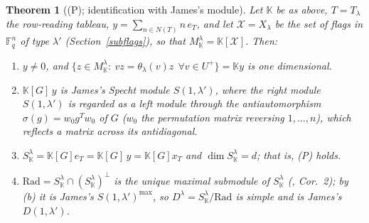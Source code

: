 \documentclass[11pt, letterpaper]{amsart}
\newtheorem{theorem}{Theorem}
\theoremstyle{definition}
\theoremstyle{remark}
\newcommand{\FF}{\mathbb{F}}
\newcommand{\KK}{\mathbb{K}}
\begin{document}
\begin{theorem}[(P); identification with James's module]\label{thmP}
Let $\KK$ be as above, $T=T_\lambda$ the row-reading tableau, $y=\sum_{n\in N(T)}n\,e_T$, and let $\mathcal X=X_\lambda$ be the set of flags in $\FF_q^n$ of type $\lambda'$ (Section~\ref{subflags}), so that $M^\lambda_\KK=\KK[\mathcal X]$. Then:
\begin{enumerate}
\item[(a)] $y\neq0$, and $\{z\in M^\lambda_\KK:\ vz=\theta_\lambda(v)z\ \ \forall v\in U^+\}=\KK y$ is one dimensional.
\item[(b)] $\KK[G]\,y$ is James's Specht module $S(1,\lambda')$, where the right module $S(1,\lambda')$ is regarded as a left module through the antiautomorphism $\sigma(g)=w_0g^{T}w_0$ of $G$ ($w_0$ the permutation matrix reversing $1,\dots,n$), which reflects a matrix across its antidiagonal.
\item[(c)] $S^\lambda_\KK=\KK[G]e_T=\KK[G]\,y=\KK[G]x_T$ and $\dim S^\lambda_\KK=d$; that is, (P) holds.
\item[(d)] $\mathrm{Rad}=S^\lambda_\KK\cap(S^\lambda_\KK)^\perp$ is the unique maximal submodule of $S^\lambda_\KK$ (\cite{AN2}, Cor.~2); by (b) it is James's $S(1,\lambda')^{\max}$, so $D^\lambda=S^\lambda_\KK/\mathrm{Rad}$ is simple and is James's $D(1,\lambda')$.
\end{enumerate}
\end{theorem}
\end{document}
